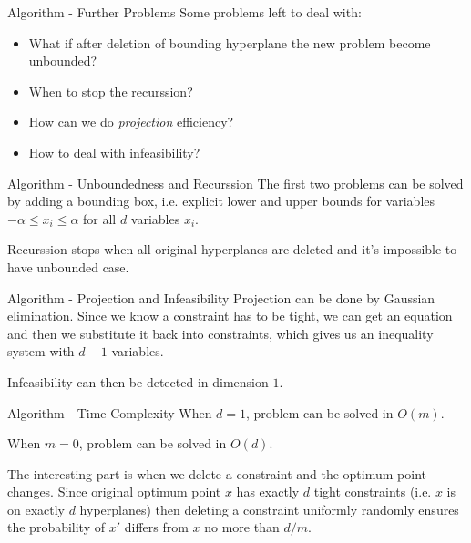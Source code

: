 \documentclass{beamer}
\begin{document}
\begin{frame}{Algorithm - Further Problems}
	Some problems left to deal with:

	\begin{itemize}
		\item What if after deletion of bounding hyperplane the new problem become unbounded?
		\item When to stop the recurssion?
		\item How can we do \textit{projection} efficiency?
		\item How to deal with infeasibility?
	\end{itemize}
\end{frame}
\begin{frame}{Algorithm - Unboundedness and Recurssion}
	The first two problems can be solved by adding a bounding box, i.e. explicit lower and upper bounds for
	variables $-\alpha \le x_i \le \alpha$ for all $d$ variables $x_i$.

	\vspace{\baselineskip}

	Recurssion stops when all original hyperplanes are deleted and it's impossible to have unbounded case.
\end{frame}
\begin{frame}{Algorithm - Projection and Infeasibility}
	Projection can be done by Gaussian elimination. Since we know a constraint has to be
	tight, we can get an equation and then we substitute it back into constraints, which
	gives us an inequality system with $d-1$ variables.

	\vspace{\baselineskip}

	Infeasibility can then be detected in dimension $1$.
\end{frame}
\begin{frame}{Algorithm - Time Complexity}
	When $d = 1$, problem can be solved in $O(m)$.

	\vspace{\baselineskip}

	When $m = 0$, problem can be solved in $O(d)$.

	\vspace{\baselineskip}

	The interesting part is when we delete a constraint and the optimum point changes.
	Since original optimum point $x$ has exactly $d$ tight constraints (i.e.
	$x$ is on exactly $d$ hyperplanes) then deleting a constraint uniformly randomly ensures
	the probability of $x'$ differs from $x$ no more than $d / m$.
\end{frame}
\end{document}
